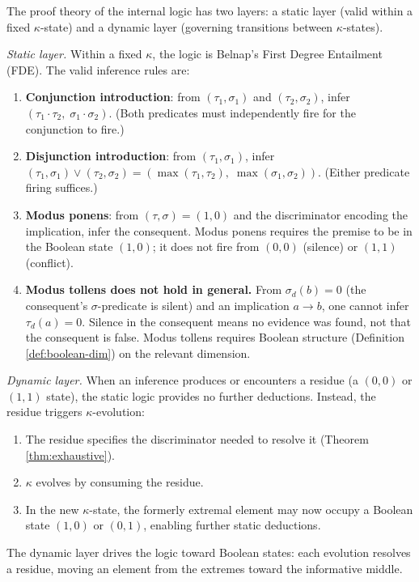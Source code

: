 \begin{theorem}\label{thm:proof-theory}
The proof theory of the internal logic has two layers:
a static layer (valid within a fixed $\kappa$-state) and
a dynamic layer (governing transitions between
$\kappa$-states).

\emph{Static layer.}
Within a fixed $\kappa$, the logic is Belnap's
First Degree Entailment (FDE). The valid inference rules
are:
\begin{enumerate}[label=(\roman*),nosep]
  \item \textbf{Conjunction introduction}: from
    $(\tau_1, \sigma_1)$ and $(\tau_2, \sigma_2)$, infer
    $(\tau_1 \cdot \tau_2,\; \sigma_1 \cdot \sigma_2)$.
    (Both predicates must independently fire for the
    conjunction to fire.)
  \item \textbf{Disjunction introduction}: from
    $(\tau_1, \sigma_1)$, infer
    $(\tau_1, \sigma_1) \vee (\tau_2, \sigma_2) =
    (\max(\tau_1, \tau_2),\; \max(\sigma_1, \sigma_2))$.
    (Either predicate firing suffices.)
  \item \textbf{Modus ponens}: from $(\tau, \sigma) = (1,0)$
    and the discriminator encoding the implication, infer
    the consequent. Modus ponens requires the premise to be
    in the Boolean state $(1,0)$; it does not fire from
    $(0,0)$ (silence) or $(1,1)$ (conflict).
  \item \textbf{Modus tollens does not hold in general.}
    From $\sigma_d(b) = 0$ (the consequent's $\sigma$-predicate
    is silent) and an implication $a \to b$, one cannot
    infer $\tau_d(a) = 0$. Silence in the consequent means
    no evidence was found, not that the consequent is false.
    Modus tollens requires Boolean structure
    (Definition \ref{def:boolean-dim}) on the relevant
    dimension.
\end{enumerate}

\emph{Dynamic layer.}
When an inference produces or encounters a residue
(a $(0,0)$ or $(1,1)$ state), the static logic provides
no further deductions. Instead, the residue triggers
$\kappa$-evolution:
\begin{enumerate}[label=(\roman*),nosep]
  \item The residue specifies the discriminator needed
    to resolve it (Theorem \ref{thm:exhaustive}).
  \item $\kappa$ evolves by consuming the residue.
  \item In the new $\kappa$-state, the formerly extremal
    element may now occupy a Boolean state $(1,0)$ or
    $(0,1)$, enabling further static deductions.
\end{enumerate}
The dynamic layer drives the logic toward Boolean states:
each evolution resolves a residue, moving an element from
the extremes toward the informative middle.
\end{theorem}

